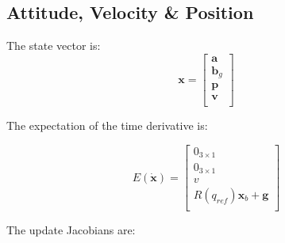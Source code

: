 \documentclass[a4paper]{paper}
\begin{document}
\subsection{Attitude, Velocity \& Position}

The state vector is:
\begin{equation}
    \bm{x} = \left[
        \begin{matrix}
            \bm{a}\\[0.3em]
            \bm{b}_g\\[0.3em]
            \bm{p}\\[0.3em]
            \bm{v}\\[0.3em]
        \end{matrix}
        \right]
\end{equation}

The expectation of the time derivative is:

\begin{equation}
    E (\bm{\dot x}) = \left[
        \begin{matrix}
            0_{3\times1}\\[0.3em]
            0_{3\times1}\\[0.3em]
            v\\[0.3em]
            R(q_{ref})\bm{x}_b + \bm{g}\\
        \end{matrix}
        \right]
\end{equation}

The update Jacobians are:
\end{document}
